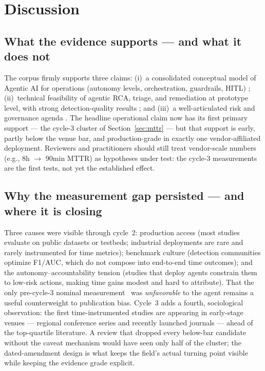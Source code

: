 \documentclass{ieeeaccess}
\begin{document}
\section{Discussion}
\label{sec:discussion}

\subsection{What the evidence supports --- and what it does not}
The corpus firmly supports three claims: (i)~a consolidated conceptual
model of Agentic AI for operations (autonomy levels, orchestration,
guardrails, HITL) \cite{P09,P10,P15,P54,P112}; (ii)~technical
feasibility of agentic RCA, triage, and remediation at prototype level,
with strong detection-quality results
\cite{P21,P22,P27,P28,P31,P35,P102}; and (iii)~a well-articulated risk
and governance agenda \cite{P01,P12,P17,P14,P94}. The headline
operational claim now has its first primary support --- the cycle-3
cluster of Section~\ref{sec:mttr} --- but that support is early,
partly below the venue bar, and production-grade in exactly one
vendor-affiliated deployment. Reviewers and practitioners should
still treat vendor-scale numbers (e.g., 8h $\rightarrow$ 90min MTTR) as
hypotheses under test: the cycle-3 measurements are the first tests, not
yet the established effect.

\subsection{Why the measurement gap persisted --- and where it is closing}
Three causes were visible through cycle~2: production access (most
studies evaluate on public datasets or testbeds; industrial deployments
are rare and rarely instrumented for time metrics); benchmark culture
(detection communities optimize F1/AUC, which do not compose into
end-to-end time outcomes); and the autonomy--accountability tension
(studies that deploy agents constrain them to low-risk actions, making
time gains modest and hard to attribute). That the only pre-cycle-3
nominal measurement~\cite{P76} was \emph{unfavorable} to the agent
remains a useful counterweight to publication bias. Cycle~3 adds a
fourth, sociological observation: the first time-instrumented studies
are appearing in early-stage venues --- regional conference series and
recently launched journals --- ahead of the top-quartile literature. A
review that dropped every below-bar candidate without the caveat
mechanism would have seen only half of the cluster; the dated-amendment
design is what keeps the field's actual turning point visible while
keeping the evidence grade explicit.
\end{document}
